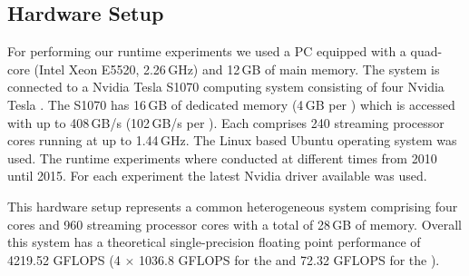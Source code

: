 \subsection{Hardware Setup}
For performing our runtime experiments we used a PC equipped with a quad-core \CPU (Intel Xeon E5520, 2.26\,GHz) and 12\,GB of main memory.
The system is connected to a Nvidia Tesla S1070 computing system consisting of four Nvidia Tesla \GPUs.
The S1070 has 16\,GB of dedicated memory (4\,GB per \GPU) which is accessed with up to 408\,GB/s (102\,GB/s per \GPU).
Each \GPU comprises 240 streaming processor cores running at up to 1.44\,GHz.
The Linux based Ubuntu operating system was used.
The runtime experiments where conducted at different times from 2010 until 2015.
For each experiment the latest Nvidia \GPU driver available was used.

This hardware setup represents a common heterogeneous system comprising four \CPU cores and 960 \GPU streaming processor cores with a total of 28\,GB of memory.
Overall this system has a theoretical single-precision floating point performance of 4219.52 GFLOPS (4 $\times$ 1036.8 GFLOPS for the \GPUs and 72.32 GFLOPS for the \CPU).

